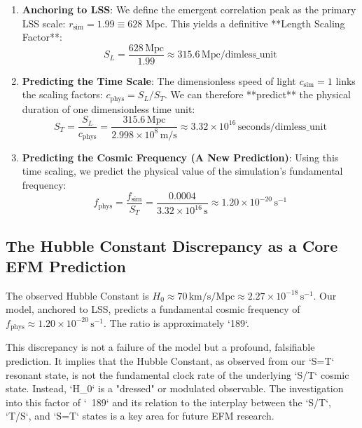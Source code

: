 \documentclass[11pt]{article}
\begin{document}
\begin{enumerate}
    \item \textbf{Anchoring to LSS}: We define the emergent correlation peak as the primary LSS scale: \(r_{\text{sim}} = 1.99 \equiv 628\) Mpc. This yields a definitive **Length Scaling Factor**:
    \begin{equation}
    S_L = \frac{628 \, \text{Mpc}}{1.99} \approx 315.6 \, \text{Mpc/dimless\_unit}
    \end{equation}
    
    \item \textbf{Predicting the Time Scale}: The dimensionless speed of light \(c_{\text{sim}}=1\) links the scaling factors: \(c_{\text{phys}} = S_L / S_T\). We can therefore **predict** the physical duration of one dimensionless time unit:
    \begin{equation}
    S_T = \frac{S_L}{c_{\text{phys}}} = \frac{315.6 \, \text{Mpc}}{2.998 \times 10^8 \, \text{m/s}} \approx 3.32 \times 10^{16} \, \text{seconds/dimless\_unit}
    \end{equation}
    
    \item \textbf{Predicting the Cosmic Frequency (A New Prediction)}: Using this time scaling, we predict the physical value of the simulation's fundamental frequency:
    \begin{equation}
    f_{\text{phys}} = \frac{f_{\text{sim}}}{S_T} = \frac{0.0004}{3.32 \times 10^{16} \, \text{s}} \approx 1.20 \times 10^{-20} \, \text{s}^{-1}
    \end{equation}
\end{enumerate}

\subsection{The Hubble Constant Discrepancy as a Core EFM Prediction}
The observed Hubble Constant is \(H_0 \approx 70 \, \text{km/s/Mpc} \approx 2.27 \times 10^{-18} \, \text{s}^{-1}\). Our model, anchored to LSS, predicts a fundamental cosmic frequency of \(f_{\text{phys}} \approx 1.20 \times 10^{-20} \, \text{s}^{-1}\). The ratio is approximately `189`.

This discrepancy is not a failure of the model but a profound, falsifiable prediction. It implies that the Hubble Constant, as observed from our `S=T` resonant state, is not the fundamental clock rate of the underlying `S/T` cosmic state. Instead, `H_0` is a "dressed" or modulated observable. The investigation into this factor of `~189` and its relation to the interplay between the `S/T`, `T/S`, and `S=T` states is a key area for future EFM research.
\end{document}
